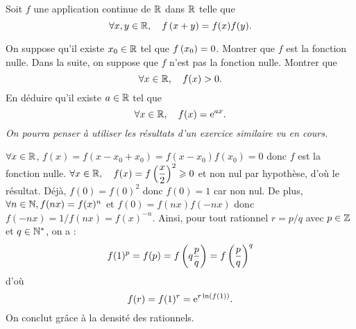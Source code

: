 \documentclass{magnolia}
\begin{document}
Soit $f$ une application continue de $\mathbb{R}$ dans $\mathbb{R}$ telle que
\[\forall x,y\in\mathbb{R} ,\quad f\left(x+y\right)=f(x)f(y).\]
\begin{questions}
\question On suppose qu'il existe $x_0\in\mathbb{R}$ tel que $f\left(x_0\right)=0$. Montrer que
  $f$ est la fonction nulle.
\enonce Dans la suite, on suppose que $f$ n'est pas la fonction nulle.
\question Montrer que
  \[\forall x\in\mathbb{R} ,\quad f(x)>0.\]
\question En déduire qu'il existe $a\in\mathbb{R}$ tel que
  \[\forall x\in\mathbb{R} ,\quad f(x)={\rm e}^{ax}.\]
  \textit{On pourra penser à utiliser les résultats d'un exercice similaire vu en cours.}
\end{questions}

\begin{sol}
\begin{questions}
\question $\forall x \in \mathbb{R}$, $f(x)=f(x-x_0+x_0)=f(x-x_0)f(x_0)=0$ donc $f$ est la fonction nulle.
\question $\forall x\in\mathbb{R} ,\quad f(x)=f\left(\dfrac{x}{2}\right)^2\geqslant 0$ et non nul par hypothèse, d'où le résultat.
\question Déjà, $f(0)=f(0)^2$ donc $f(0)=1$ car non nul. De plus, $\forall n \in \mathbb{N}, f(nx)=f(x)^n$ et $f(0)=f(nx)f(-nx)$ donc $f(-nx)=1/f(nx)=f(x)^{-n}$. 
Ainsi, pour tout rationnel $r=p/q$ avec $p\in \mathbb{Z}$ et $q\in {\mathbb{N}^*}$, on a :
$$f(1)^p=f(p)=f\left(q\frac{p}{q}\right)=f\left(\frac{p}{q}\right)^q$$ d'où $$f(r)=f(1)^r={\rm e}^{r\ln(f(1))}.$$
On conclut grâce à la densité des rationnels.
\end{questions}
\end{sol}


\end{document}
